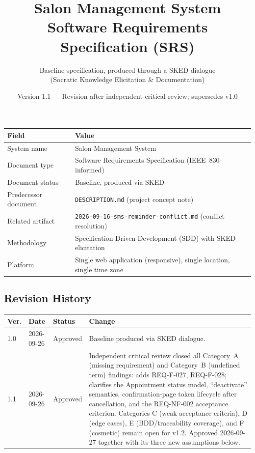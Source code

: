 \documentclass[11pt,a4paper]{article}
\title{Salon Management System\\
\large Software Requirements Specification (SRS)}
\author{Baseline specification, produced through a SKED dialogue \\ (Socratic Knowledge Elicitation \& Documentation)}
\date{Version 1.1 --- Revision after independent critical review; supersedes v1.0}
\begin{document}
\maketitle

\begin{center}
\begin{tabularx}{0.9\textwidth}{@{}lX@{}}
\toprule
Field & Value \\
\midrule
System name & Salon Management System \\
Document type & Software Requirements Specification (IEEE~830-informed) \\
Document status & Baseline, produced via SKED \\
Predecessor document & \texttt{DESCRIPTION.md} (project concept note) \\
Related artifact & \texttt{2026-09-16-sms-reminder-conflict.md} (conflict resolution) \\
Methodology & Specification-Driven Development (SDD) with SKED elicitation \\
Platform & Single web application (responsive), single location, single time zone \\
\bottomrule
\end{tabularx}
\end{center}

\subsection*{Revision History}
\begin{tabularx}{\textwidth}{@{}lll X@{}}
\toprule
Ver. & Date & Status & Change \\
\midrule
1.0 & 2026-09-26 & Approved & Baseline produced via SKED dialogue. \\
1.1 & 2026-09-26 & Approved & Independent critical review closed all
  Category~A (missing requirement) and Category~B (undefined term)
  findings: adds REQ-F-027, REQ-F-028; clarifies the Appointment status
  model, ``deactivate'' semantics, confirmation-page token lifecycle after
  cancellation, and the REQ-NF-002 acceptance criterion. Categories C
  (weak acceptance criteria), D (edge cases), E (BDD/traceability
  coverage), and F (cosmetic) remain open for v1.2. Approved 2026-09-27
  together with its three new assumptions below. \\
\bottomrule
\end{tabularx}
\end{document}
